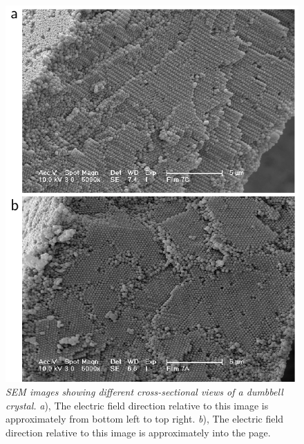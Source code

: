 \begin{figure}[htbp]
\centering
\includegraphics[width=1.0\textwidth]{figures/CsuppFigure3.pdf}
\caption{\label{fig:crystalSEM1} \emph{SEM images showing different cross-sectional views of a dumbbell crystal.}
	\emph{a}), The electric field direction relative to this image is approximately from bottom left to top right.
	\emph{b}), The electric field direction relative to this image is approximately into the page.}
\end{figure}


